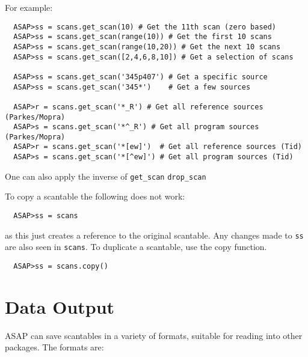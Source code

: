 \documentclass[11pt]{article}
\newcommand{\cmd}[1]{{\tt #1}}
\begin{document}
For example:

\begin{verbatim}
  ASAP>ss = scans.get_scan(10) # Get the 11th scan (zero based)
  ASAP>ss = scans.get_scan(range(10)) # Get the first 10 scans
  ASAP>ss = scans.get_scan(range(10,20)) # Get the next 10 scans
  ASAP>ss = scans.get_scan([2,4,6,8,10]) # Get a selection of scans

  ASAP>ss = scans.get_scan('345p407') # Get a specific source
  ASAP>ss = scans.get_scan('345*')    # Get a few sources

  ASAP>r = scans.get_scan('*_R') # Get all reference sources (Parkes/Mopra)
  ASAP>s = scans.get_scan('*^_R') # Get all program sources (Parkes/Mopra)
  ASAP>r = scans.get_scan('*[ew]')  # Get all reference sources (Tid)
  ASAP>s = scans.get_scan('*[^ew]') # Get all program sources (Tid)

\end{verbatim}

One can also apply the inverse of \cmd{get\_scan} \cmd{drop\_scan}

To copy a scantable the following does not work:

\begin{verbatim}
  ASAP>ss = scans
\end{verbatim}

as this just creates a reference to the original scantable. Any
changes made to \cmd{ss} are also seen in \cmd{scans}. To duplicate a
scantable, use the copy function.

\begin{verbatim}
  ASAP>ss = scans.copy()
\end{verbatim}

\section{Data Output}

ASAP can save scantables in a
variety of formats, suitable for reading into other packages. The
formats are:
\end{document}
